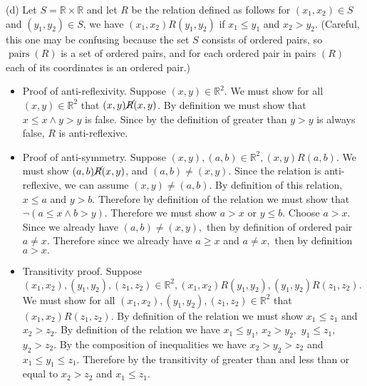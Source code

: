 \documentclass[12pt, letterpaper]{article}
\newcommand{\R}{\mathbb{R}}
\begin{document}
(d) Let $S=\mathbb{R} \times \mathbb{R}$ and let $R$ be the relation defined as follows for $\left(x_1, x_2\right) \in S$ and $\left(y_1, y_2\right) \in S$, we have $\left(x_1, x_2\right) R\left(y_1, y_2\right)$ if $x_1 \leq y_1$ and $x_2>y_2$. (Careful, this one may be confusing because the set $S$ consists of ordered pairs, so $\operatorname{pairs}(R)$ is a set of ordered pairs, and for each ordered pair in pairs $(R)$ each of its coordinates is an ordered pair.)\\
\begin{itemize}
	\item Proof of anti-reflexivity.  Suppose $(x,y) \in \R^2.$  We must show for all $(x,y) \in \R^2$ that $(x,y) \cancel{R} (x,y)$.  By definition we must show that $x\leq x \wedge y > y$ is false.  Since by the definition of greater than $y >y$ is always false, $R$ is anti-reflexive. 
	\item Proof of anti-symmetry.  Suppose $(x,y),(a,b) \in \R^2, (x,y)R(a,b)$.  We must show $(a,b) \cancel{R} (x,y)$, and $(a,b) \neq (x,y).$  Since the relation is anti-reflexive, we can assume $(x,y) \neq (a,b).$  By definition of this relation, $x \leq a$ and $y > b.$  Therefore by definition of the relation we must show that  $\neg (a \leq x \wedge b > y).$  Therefore we must show $a > x$ or $y \leq b.$  Choose $a > x.$  Since we already have $(a,b) \neq (x,y),$ then by definition of ordered pair $a \neq x.$  Therefore since we already have $a \geq x $ and $a \neq x,$ then by definition $a > x.$
	\item Transitivity proof.  Suppose $(x_1,x_2),(y_1,y_2),(z_1,z_2) \in \R^2, (x_1,x_2)R(y_1,y_2), (y_1,y_2)R(z_1,z_2).$ We must show for all $(x_1,x_2),(y_1,y_2),(z_1,z_2) \in \R^2$ that $(x_1,x_2)R(z_1,z_2).$  By definition of the relation we must show $x_1 \leq z_1$ and $x_2 > z_2.$  By definition of the relation we have $x_1 \leq y_1$, $x_2 > y_2,$ $y_1 \leq z_1,$ $y_2 > z_2.$  By the composition of inequalities we have $x_2 > y_2 > z_2$ and $x_1 \leq y_1 \leq z_1.$  Therefore by the transitivity of greater than and less than or equal to $x_2 > z_2$ and $x_1 \leq z_1.$
\end{itemize}
\end{document}
